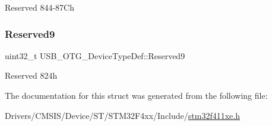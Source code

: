 Reserved 844-\/87\+Ch \mbox{\label{struct_u_s_b___o_t_g___device_type_def_a7d7b3f7c72c92856e77d149c43200709}} 
\subsubsection{\texorpdfstring{Reserved9}{Reserved9}}
{\footnotesize\ttfamily uint32\+\_\+t U\+S\+B\+\_\+\+O\+T\+G\+\_\+\+Device\+Type\+Def\+::\+Reserved9}

Reserved 824h 

The documentation for this struct was generated from the following file\+:\begin{DoxyCompactItemize}
\item 
Drivers/\+C\+M\+S\+I\+S/\+Device/\+S\+T/\+S\+T\+M32\+F4xx/\+Include/\hyperlink{stm32f411xe_8h}{stm32f411xe.\+h}\end{DoxyCompactItemize}
